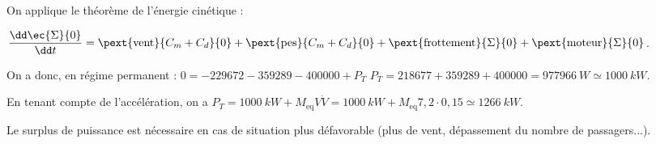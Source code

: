\ifprof\begin{corrige}
On applique le théorème de l'énergie cinétique :

$\dfrac{\dd \ec{\Sigma}{0}}{\dd t} =\pext{\text{vent}}{C_m+C_d}{0} + \pext{\text{pes}}{C_m+C_d}{0} + \pext{\text{frottement}}{\Sigma}{0}+ \pext{\text{moteur}}{\Sigma}{0}$.

On a donc, en régime permanent : 
$0 = -229672-359289-400 000 +P_T $ $ P_T= 218677 + 359289 + 400 000 = \SI{977966}{W} \simeq \SI{1000}{kW}$.

En tenant compte de l'accélération, on a $P_T = \SI{1000}{kW}+  M_{\text{eq}} V\dot{V} =  \SI{1000}{kW}+  M_{\text{eq}} 7,2 \cdot 0,15 \simeq \SI{1266}{kW}$. 

Le surplus de puissance est nécessaire en cas de situation plus défavorable (plus de vent, dépassement du nombre de passagers...). 
\end{corrige}\else\fi

\ifprof
\else

